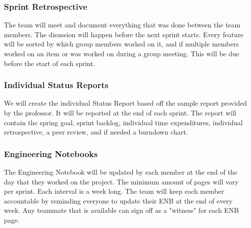 

\subsubsection{Sprint Retrospective}
The team will meet and document everything that was done between the team members. The disussion will happen before the next sprint starts. Every feature will be sorted by which group members worked on it, and if multiple members worked on an item or was worked on during a group meeting. This will be due before the start of each sprint.

\subsubsection{Individual Status Reports}
We will create the individual Status Report based off the sample report provided by the professor. It will be reported at the end of each sprint. The report will contain the spring goal, sprint backlog, individual time expenditures, individual retrospective, a peer review, and if needed a burndown chart. 

\subsubsection{Engineering Notebooks}
The Engineering Notebook will be updated by each member at the end of the day that they worked on the project. The minimum amount of pages will vary per sprint. Each interval is a week long. The team will keep each member accountable by reminding everyone to update their ENB at the end of every week. Any teammate that is available can sign off as a "witness" for each ENB page.

